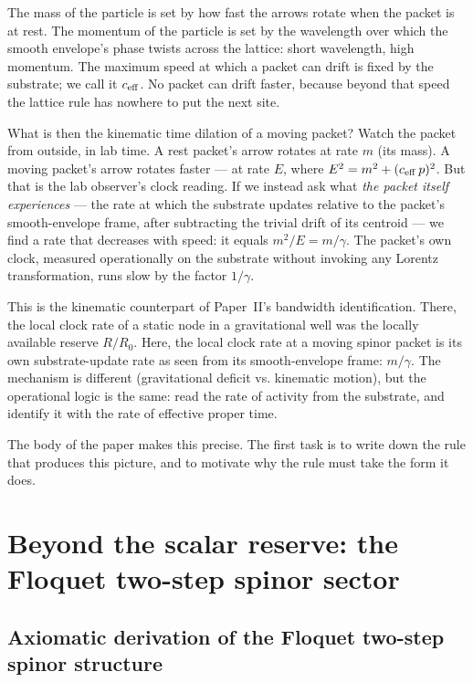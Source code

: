 \documentclass[11pt,a4paper]{article}
\begin{document}
The mass of the particle is set by how fast the arrows rotate
when the packet is at rest. The momentum of the particle is set
by the wavelength over which the smooth envelope's phase
twists across the lattice: short wavelength, high momentum.
The maximum speed at which a packet can drift is fixed by the
substrate; we call it $c_{\rm eff}$. No packet can drift
faster, because beyond that speed the lattice rule has nowhere
to put the next site.

What is then the kinematic time dilation of a moving packet?
Watch the packet from outside, in lab time. A rest packet's
arrow rotates at rate $m$ (its mass). A moving packet's arrow
rotates faster --- at rate $E$, where $E^2 = m^2 +
(c_{\rm eff}\, p)^2$. But that is the lab observer's clock
reading. If we instead ask what \emph{the packet itself
experiences} --- the rate at which the substrate updates
relative to the packet's smooth-envelope frame, after
subtracting the trivial drift of its centroid --- we find a
rate that decreases with speed: it equals $m^2/E = m/\gamma$.
The packet's own clock, measured operationally on the substrate
without invoking any Lorentz transformation, runs slow by the
factor $1/\gamma$.

This is the kinematic counterpart of Paper~II's bandwidth
identification. There, the local clock rate of a static node in
a gravitational well was the locally available reserve $R/R_0$.
Here, the local clock rate at a moving spinor packet is its
own substrate-update rate as seen from its smooth-envelope
frame: $m/\gamma$. The mechanism is different (gravitational
deficit vs. kinematic motion), but the operational logic is
the same: read the rate of activity from the substrate, and
identify it with the rate of effective proper time.

The body of the paper makes this precise. The first task is to
write down the rule that produces this picture, and to motivate
why the rule must take the form it does.

\section{Beyond the scalar reserve: the Floquet two-step spinor sector}
\label{sec:substrate}

\subsection{Axiomatic derivation of the Floquet two-step spinor structure}
\label{sec:floquet-axiomatic}
\end{document}
